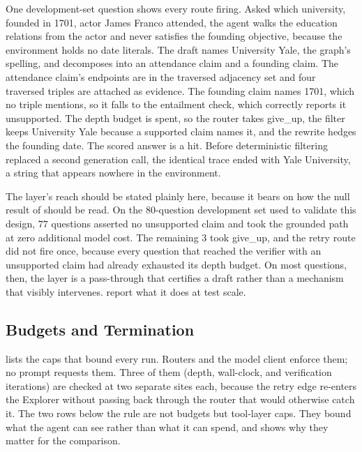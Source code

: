 One development-set question shows every route firing. Asked which
university, founded in 1701, actor James Franco attended, the agent
walks the education relations from the actor and never satisfies the
founding objective, because the environment holds no date literals. The
draft names \textsf{University Yale}, the graph's spelling, and
decomposes into an attendance claim and a founding claim. The attendance
claim's endpoints are in the traversed adjacency set and four traversed
triples are attached as evidence. The founding claim names
\textsf{1701}, which no triple mentions, so it falls to the entailment
check, which correctly reports it unsupported. The depth budget is
spent, so the router takes \textsf{give\_up}, the filter keeps
\textsf{University Yale} because a supported claim names it, and the
rewrite hedges the founding date. The scored answer is a hit. Before
deterministic filtering replaced a second generation call, the identical
trace ended with \textsf{Yale University}, a string that appears nowhere
in the environment.

The layer's reach should be stated plainly here, because it bears on how
the null result of  should be read. On the
$80$-question development set used to validate this design, $77$
questions asserted no unsupported claim and took the grounded path at
zero additional model cost. The remaining $3$ took \textsf{give\_up},
and the retry route did not fire once, because every question that
reached the verifier with an unsupported claim had already exhausted its
depth budget. On most questions, then, the layer is a pass-through that
certifies a draft rather than a mechanism that visibly intervenes.
 report what
it does at test scale.

\subsection{Budgets and Termination}\label{sec:budgets}

 lists the caps that bound every run. Routers and the
model client enforce them; no prompt requests them. Three of them
(depth, wall-clock, and verification iterations) are checked at two
separate sites each, because the \textsf{retry} edge re-enters the
Explorer without passing back through the router that would otherwise
catch it. The two rows below the rule are not budgets but tool-layer
caps. They bound what the agent can see rather than what it can spend,
and  shows why they matter for the comparison.

